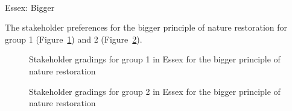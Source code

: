 \documentclass[
  12pt,
  letterpaper,
  DIV=11,
  numbers=noendperiod]{scrartcl}
\makeatletter
\let\oldparagraph\paragraph
\renewcommand{\paragraph}{
    \@ifstar
      \xxxParagraphStar
      \xxxParagraphNoStar
  }
\newcommand{\xxxParagraphStar}[1]{\oldparagraph*{#1}\mbox{}}
\newcommand{\xxxParagraphNoStar}[1]{\oldparagraph{#1}\mbox{}}
\makeatother
\begin{document}
\newpage{}

\paragraph{Essex: Bigger}\label{essex-bigger}

The stakeholder preferences for the bigger principle of nature
restoration for group 1 (Figure~\ref{fig-EsBigG1}) and 2
(Figure~\ref{fig-EsBigG2}).

\begin{figure}[H]


\caption{\label{fig-EsBigG1}Stakeholder gradings for group 1 in Essex
for the bigger principle of nature restoration}

\end{figure}%

\begin{figure}[H]


\caption{\label{fig-EsBigG2}Stakeholder gradings for group 2 in Essex
for the bigger principle of nature restoration}

\end{figure}%
\end{document}

